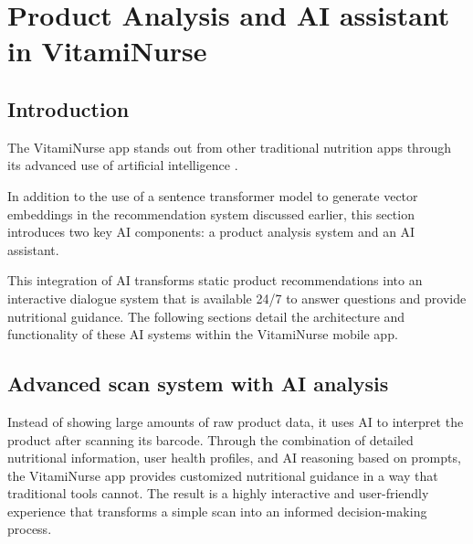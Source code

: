 

\chapter{Product Analysis and AI assistant in VitamiNurse}
\section*{Introduction}
The VitamiNurse app stands out from other traditional nutrition apps through its advanced use of artificial intelligence .

In addition to the use of a sentence transformer model to generate vector embeddings in the recommendation system discussed earlier, this section introduces two key AI components: a product analysis system and an AI assistant.

This integration of AI transforms static product recommendations into an interactive dialogue system that is available 24/7 to answer questions and provide nutritional guidance. The following sections detail the architecture and functionality of these AI systems within the VitamiNurse mobile app.

\section{Advanced scan system with AI analysis }

Instead of showing large amounts of raw product data, it uses AI to interpret the product after scanning its barcode.  Through the combination of detailed nutritional information, user health profiles, and AI reasoning based on prompts, the VitamiNurse app provides customized nutritional guidance in a way that traditional tools cannot. The result is a highly interactive and user-friendly experience that transforms a simple scan into an informed decision-making process.

